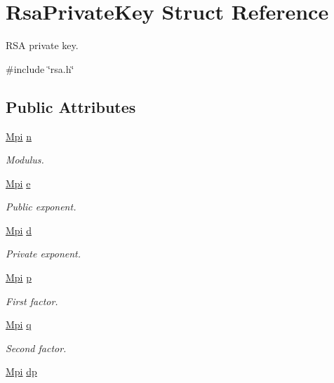 \hypertarget{structRsaPrivateKey}{}\section{Rsa\+Private\+Key Struct Reference}
\label{structRsaPrivateKey}


R\+SA private key.  




{\ttfamily \#include \char`\"{}rsa.\+h\char`\"{}}

\subsection*{Public Attributes}
\begin{DoxyCompactItemize}
\item 
\hyperlink{structMpi}{Mpi} \hyperlink{structRsaPrivateKey_aaccaccd76db1a21201bf06eb6ecdd8ac}{n}
\begin{DoxyCompactList}\small\item\em Modulus. \end{DoxyCompactList}\item 
\hyperlink{structMpi}{Mpi} \hyperlink{structRsaPrivateKey_a590822495b6caceae5f8880cacc51b9c}{e}
\begin{DoxyCompactList}\small\item\em Public exponent. \end{DoxyCompactList}\item 
\hyperlink{structMpi}{Mpi} \hyperlink{structRsaPrivateKey_aea064a2875da9d2a44c7e7c02e157728}{d}
\begin{DoxyCompactList}\small\item\em Private exponent. \end{DoxyCompactList}\item 
\hyperlink{structMpi}{Mpi} \hyperlink{structRsaPrivateKey_a1fc8b1ca097c70244db691916f33f891}{p}
\begin{DoxyCompactList}\small\item\em First factor. \end{DoxyCompactList}\item 
\hyperlink{structMpi}{Mpi} \hyperlink{structRsaPrivateKey_aefd3ef59482ac00637165b624625fef5}{q}
\begin{DoxyCompactList}\small\item\em Second factor. \end{DoxyCompactList}\item 
\hyperlink{structMpi}{Mpi} \hyperlink{structRsaPrivateKey_ab101b4e579a4799f12d3acd237e72b34}{dp}

\end{DoxyCompactItemize}
